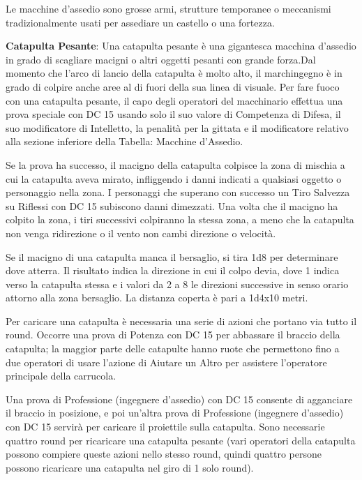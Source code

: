 \documentclass[a4paper,11pt,twoside,openany]{book}
\begin{document}
Le macchine d'assedio sono grosse armi, strutture temporanee o meccanismi tradizionalmente usati per assediare un castello o una fortezza.

\textbf{Catapulta Pesante}: Una catapulta pesante è una gigantesca macchina d'assedio in grado di scagliare macigni o altri oggetti pesanti con grande forza.Dal momento che l'arco di lancio della catapulta è molto alto, il marchingegno è in grado di colpire anche aree al di fuori della sua linea di visuale. Per fare fuoco con una catapulta pesante, il capo degli operatori del macchinario effettua una prova speciale con DC 15 usando solo il suo valore di Competenza di Difesa, il suo modificatore di Intelletto, la penalità per la gittata e il modificatore relativo alla sezione inferiore della Tabella: Macchine d'Assedio.

Se la prova ha successo, il macigno della catapulta colpisce la zona di mischia a cui la catapulta aveva mirato, infliggendo i danni indicati a qualsiasi oggetto o personaggio nella zona. I personaggi che superano con successo un Tiro Salvezza su Riflessi con DC 15 subiscono danni dimezzati. Una volta che il macigno ha colpito la zona, i tiri successivi colpiranno la stessa zona, a meno che la catapulta non venga ridirezione o il vento non cambi direzione o velocità.

Se il macigno di una catapulta manca il bersaglio, si tira 1d8 per determinare dove atterra. Il risultato indica la direzione in cui il colpo devia, dove 1 indica verso la catapulta stessa e i valori da 2 a 8 le direzioni successive in senso orario attorno alla zona bersaglio. La distanza coperta è pari a 1d4x10 metri.

Per caricare una catapulta è necessaria una serie di azioni che portano via tutto il round. Occorre una prova di Potenza con DC 15 per abbassare il braccio della catapulta; la maggior parte delle catapulte hanno ruote che permettono fino a due operatori di usare l'azione di Aiutare un Altro per assistere l'operatore principale della carrucola.

Una prova di Professione (ingegnere d'assedio) con DC 15 consente di agganciare il braccio in posizione, e poi un'altra prova di Professione (ingegnere d'assedio) con DC 15 servirà per caricare il proiettile sulla catapulta. Sono necessarie quattro round per ricaricare una catapulta pesante (vari operatori della catapulta possono compiere queste azioni nello stesso round, quindi quattro persone possono ricaricare una catapulta nel giro di 1 solo round).
\end{document}
